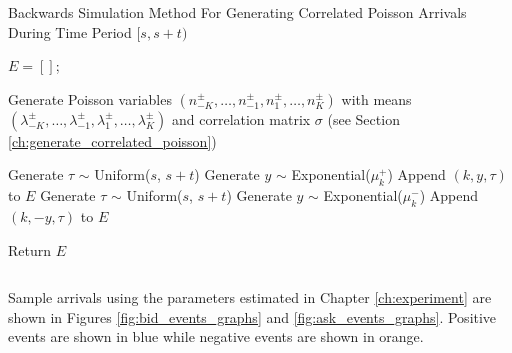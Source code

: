 \begin{algorithm}[H]
\label{alg:backwards_simulation}
\SetAlgoLined
\caption{Backwards Simulation Method For Generating Correlated Poisson Arrivals During Time Period $[s, s+t)$}
 $E = []$;

 Generate Poisson variables $(n^{\pm}_{-K}, \ldots, n^{\pm}_{-1}, n^{\pm}_1, \ldots, n^{\pm}_K)$ with means $(\lambda^{\pm}_{-K}, \ldots, \lambda^{\pm}_{-1}, \lambda^{\pm}_1, \ldots, \lambda^{\pm}_K)$ and correlation matrix $\sigma$ (see Section \ref{ch:generate_correlated_poisson}) \;
 
  {
     {
        Generate $\tau$ $\sim$ Uniform($s$, $s+t$) \;
        Generate $y$ $\sim$ Exponential($\mu^+_k$) \;
        Append $(k,y,\tau)$ to $E$ \;
    }
     {
        Generate $\tau$ $\sim$ Uniform($s$, $s+t$) \;
        Generate $y$ $\sim$ Exponential($\mu^-_k$) \;
        Append $(k,-y,\tau)$ to $E$ \;
    }
 }
 
 Return $E$ \;
 
\end{algorithm}

$$ $$

Sample arrivals using the parameters estimated in Chapter \ref{ch:experiment} are shown in Figures \ref{fig:bid_events_graphs} and \ref{fig:ask_events_graphs}. Positive events are shown in blue while negative events are shown in orange.

